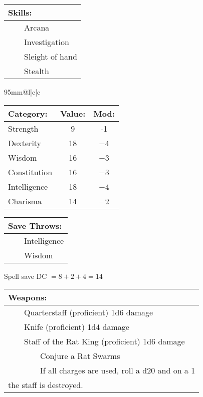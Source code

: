 \documentclass[11pt]{article}
\newcommand{\tabitem}{~~\llap{--}~~}
\newcommand{\tabtabitem}{~~~~~~\llap{$\bullet$}~~}
\begin{document}
\begin{multicols}{2}
\vspace{2mm}

\noindent \begin{tabularx}{95mm}{@{}l}
{\Large \textbf{Skills:}} \\
\hline
\tabitem Arcana \\
\tabitem Investigation \\
\tabitem Sleight of hand \\
\tabitem Stealth
		\end{tabularx}

\vspace{4mm}

\noindent \begin{tabularx}{95mm}{@{}l|c|c}
 \\
\hline
		\end{tabularx}
\noindent \begin{tabular}{@{}l|c|c}
\textbf{Category:} 			& \textbf{Value:} 	& \textbf{Mod:} \\
\hline
Strength 					& 9 				& -1 			\\
Dexterity 					& 18 				& +4 			\\
Wisdom 						& 16			 	& +3 			\\
Constitution 				& 16 				& +3 			\\
Intelligence 				& 18 				& +4 			\\
Charisma 					& 14 				& +2
		\end{tabular}

\vspace{4mm}

\noindent \begin{tabularx}{95mm}{@{}l}
{\Large \textbf{Save Throws:}} \\
\hline
\tabitem Intelligence \\
\tabitem Wisdom
		\end{tabularx}
\noindent Spell save DC $= 8 + 2 + 4 = 14$

\vspace{4mm}

\noindent \begin{tabularx}{95mm}{@{}l}
{\Large \textbf{Weapons:}} \\
\hline
\tabitem Quarterstaff (proficient) 1d6 damage \\
\tabitem Knife (proficient) 1d4 damage \\
\tabitem Staff of the Rat King (proficient) 1d6 damage \\
\tabtabitem Conjure a Rat Swarms \\
\tabtabitem If all charges are used, roll a d20 and on a 1 \\ 
the staff is destroyed.
		\end{tabularx}


\end{multicols}
\end{document}
